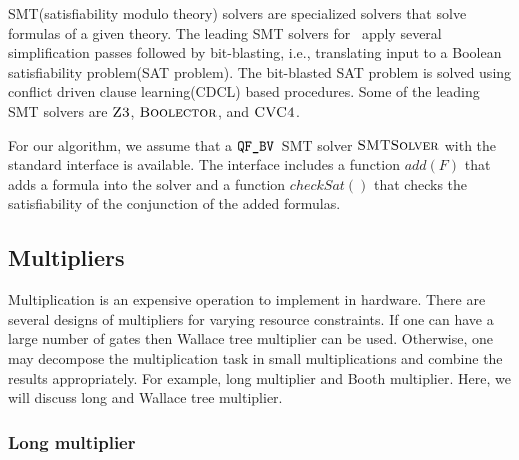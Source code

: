 SMT(satisfiability modulo theory)
solvers are specialized solvers that solve 
formulas of a given theory.
%
The leading SMT solvers for \qfbv~apply several simplification
passes followed by bit-blasting, i.e., translating input to
a Boolean satisfiability problem(SAT problem).
%
The bit-blasted SAT problem is solved using conflict driven clause
learning(CDCL)\cite{cdcl1,cdcl2} based procedures.
%
Some of the leading SMT solvers are
$\textsc{Z3}$\cite{zthree}, $\textsc{Boolector}$\cite{boolector}, and $\textsc{CVC4}$\cite{cvcfour}.

For our algorithm, we assume that a  $\texttt{QF\_BV}$~SMT
solver $\textsc{SMTSolver}$ 
with the standard interface is available.
%
The interface includes a function $add(F)$ that adds a formula
into the solver and a function $checkSat()$ that checks the
satisfiability of the conjunction of the added formulas. 

\subsection{Multipliers}

Multiplication is an expensive operation to implement in hardware.
%
There are several designs of multipliers for varying
resource constraints.
%
If one can have a large number of gates then Wallace tree
multiplier can be used.
%
Otherwise, one may decompose the multiplication task in
small multiplications and combine the results appropriately.
%
For example, long multiplier and Booth multiplier.
%
Here, we will discuss long and Wallace tree multiplier.

\subsubsection{Long multiplier}

